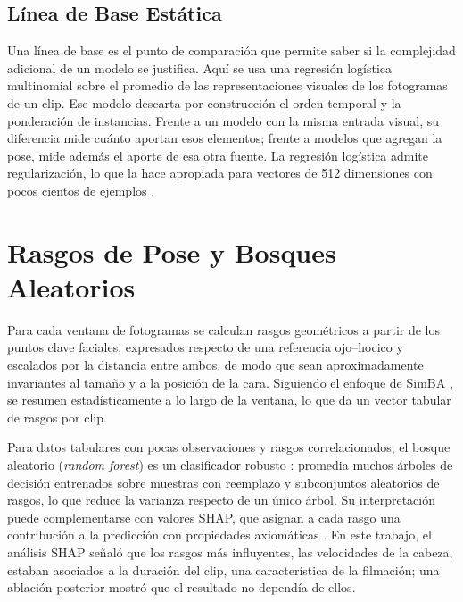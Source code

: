 \subsection{Línea de Base Estática}
Una línea de base es el punto de comparación que permite saber si la complejidad adicional de un modelo se justifica. Aquí se usa una regresión logística multinomial sobre el promedio de las representaciones visuales de los fotogramas de un clip. Ese modelo descarta por construcción el orden temporal y la ponderación de instancias. Frente a un modelo con la misma entrada visual, su diferencia mide cuánto aportan esos elementos; frente a modelos que agregan la pose, mide además el aporte de esa otra fuente. La regresión logística admite regularización, lo que la hace apropiada para vectores de 512 dimensiones con pocos cientos de ejemplos \parencite{pedregosa2011}.

\section{Rasgos de Pose y Bosques Aleatorios}
Para cada ventana de \Fotogramas{} fotogramas se calculan rasgos geométricos a partir de los puntos clave faciales, expresados respecto de una referencia ojo--hocico y escalados por la distancia entre ambos, de modo que sean aproximadamente invariantes al tamaño y a la posición de la cara. Siguiendo el enfoque de SimBA \parencite{goodwin2024}, se resumen estadísticamente a lo largo de la ventana, lo que da un vector tabular de \PoseRasgos{} rasgos por clip.

Para datos tabulares con pocas observaciones y rasgos correlacionados, el bosque aleatorio (\textit{random forest}) es un clasificador robusto \parencite{breiman2001}: promedia muchos árboles de decisión entrenados sobre muestras con reemplazo y subconjuntos aleatorios de rasgos, lo que reduce la varianza respecto de un único árbol. Su interpretación puede complementarse con valores SHAP, que asignan a cada rasgo una contribución a la predicción con propiedades axiomáticas \parencite{lundberg2017}. En este trabajo, el análisis SHAP señaló que los rasgos más influyentes, las velocidades de la cabeza, estaban asociados a la duración del clip, una característica de la filmación; una ablación posterior mostró que el resultado no dependía de ellos.

